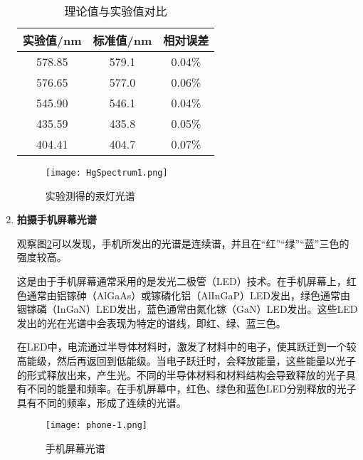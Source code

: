 \documentclass[dvipsnames, svgnames,a4paper,11pt]{article}
\begin{document}
\begin{enumerate}
				\begin{table}[htbp]
					\centering
					\begin{tabular}{|c|c|c|}
						\hline
						实验值/nm & 标准值/nm & 相对误差    \\
						\hline
						578.85 & 579.1  & 0.04\%  \\
						
						576.65 & 577.0  & 0.06\%  \\
						
						545.90 & 546.1  & 0.04\%  \\
						
						435.59 & 435.8  & 0.05\%  \\
						
						404.41 & 404.7  & 0.07\%  \\
						\hline
					\end{tabular}
					\caption{理论值与实验值对比}
					\label{tab:table2}
				\end{table}
				
				\begin{figure}[htbp]
					\centering
					\texttt{[image: HgSpectrum1.png]}
					\caption{实验测得的汞灯光谱}
					\label{fig:HgSpectrum1}
				\end{figure}
				
				
				
				\clearpage
				
			\item \textbf{拍摄手机屏幕光谱}
				
				观察图\ref{fig:phone-1}可以发现，手机所发出的光谱是连续谱，并且在“红”“绿”“蓝”三色的强度较高。
				
				这是由于手机屏幕通常采用的是发光二极管（LED）技术。在手机屏幕上，红色通常由铝镓砷（AlGaAs）或镓磷化铝（AlInGaP）LED发出，绿色通常由铟镓磷（InGaN）LED发出，蓝色通常由氮化镓（GaN）LED发出。这些LED发出的光在光谱中会表现为特定的谱线，即红、绿、蓝三色。
				
				在LED中，电流通过半导体材料时，激发了材料中的电子，使其跃迁到一个较高能级，然后再返回到低能级。当电子跃迁时，会释放能量，这些能量以光子的形式释放出来，产生光。不同的半导体材料和材料结构会导致释放的光子具有不同的能量和频率。在手机屏幕中，红色、绿色和蓝色LED分别释放的光子具有不同的频率，形成了连续的光谱。
				
				\begin{figure}[htbp]
					\centering
					\texttt{[image: phone-1.png]}
					\caption{手机屏幕光谱}
					\label{fig:phone-1}
				\end{figure}
				
		\end{enumerate}
		
\end{document}
